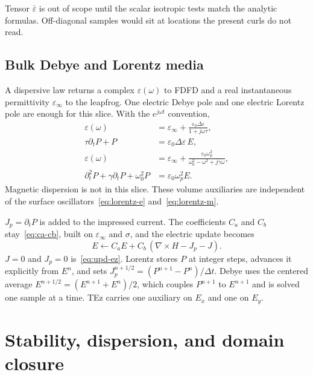 \documentclass[11pt,a4paper]{article}
\numberwithin{equation}{section}
\begin{document}
Tensor $\bar\varepsilon$ is out of scope until the scalar isotropic tests
match the analytic formulas. Off-diagonal samples would sit at locations the
present curls do not read.

\subsection{Bulk Debye and Lorentz media}
\label{sec:dispersion-bulk}

A dispersive law returns a complex $\varepsilon(\omega)$ to FDFD and a real
instantaneous permittivity $\varepsilon_\infty$ to the leapfrog. One electric
Debye pole and one electric Lorentz pole are enough for this slice. With the
$e^{j\omega t}$ convention,
\begin{align}
\varepsilon(\omega)
&= \varepsilon_\infty + \frac{\varepsilon_0\Delta\varepsilon}{1+j\omega\tau},
\label{eq:debye}\\
\tau\partial_t P + P &= \varepsilon_0\Delta\varepsilon\, E,
\label{eq:debye-ode}\\
\varepsilon(\omega)
&= \varepsilon_\infty
+ \frac{\varepsilon_0\omega_p^2}{\omega_0^2-\omega^2+j\gamma\omega},
\label{eq:lorentz-bulk}\\
\partial_t^2 P + \gamma\partial_t P + \omega_0^2 P
&= \varepsilon_0\omega_p^2 E.
\label{eq:lorentz-ode}
\end{align}
Magnetic dispersion is not in this slice. These volume auxiliaries are
independent of the surface oscillators~\eqref{eq:lorentz-e}
and~\eqref{eq:lorentz-m}.

$J_p=\partial_t P$ is added to the impressed current. The coefficients
$C_a$ and $C_b$ stay~\eqref{eq:ca-cb}, built on $\varepsilon_\infty$ and
$\sigma$, and the electric update becomes
\begin{equation}
E \leftarrow C_a E + C_b\,(\nabla\times H - J_p - J).
\label{eq:jp}
\end{equation}
$J=0$ and $J_p=0$ is~\eqref{eq:upd-ez}. Lorentz stores $P$ at integer steps,
advances it explicitly from $E^n$, and sets $J_p^{n+1/2}=(P^{n+1}-P^n)/\Delta t$.
Debye uses the centered average $E^{n+1/2}=(E^{n+1}+E^n)/2$, which couples
$P^{n+1}$ to $E^{n+1}$ and is solved one sample at a time. TEz carries one
auxiliary on $E_x$ and one on $E_y$.

\section{Stability, dispersion, and domain closure}
\label{sec:stability}
\end{document}
